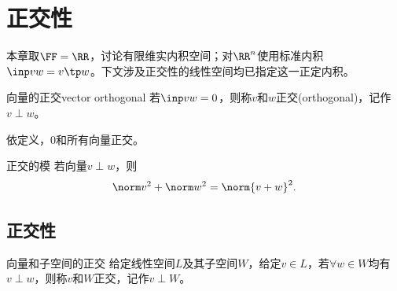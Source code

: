 \chapter{正交性}
本章取$\FF=\RR$，讨论有限维实内积空间；对$\RR^n$使用标准内积$\inp vw=v\tp w$。下文涉及正交性的线性空间均已指定这一正定内积。
\begin{definition}{向量的正交}{vector orthogonal}
	若$\inp vw=0$，则称$v$和$w$正交(orthogonal)，记作$v\perp w$。
\end{definition}
\begin{remark}
	依定义，0和所有向量正交。
\end{remark}
\begin{theorem}{正交的模}{}
	若向量$v\perp w$，则
	\begin{align}
		\norm v^2+\norm w^2=\norm{v+w}^2.
	\end{align}
\end{theorem}

\section{正交性}

\begin{definition}
	{向量和子空间的正交}{}
	给定线性空间$L$及其子空间$W$，给定$v\in L$，若$\forall w\in W$均有$v\perp w$，则称$v$和$W$正交，记作$v\perp W$。
\end{definition}

